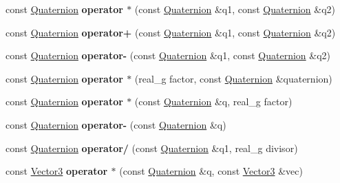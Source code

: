 \begin{DoxyCompactItemize}
\item 
\mbox{\label{classrev_1_1_quaternion_ade93d386a958d857910c26f3123c7700}} 
const \mbox{\hyperlink{classrev_1_1_quaternion}{Quaternion}} {\bfseries operator $\ast$} (const \mbox{\hyperlink{classrev_1_1_quaternion}{Quaternion}} \&q1, const \mbox{\hyperlink{classrev_1_1_quaternion}{Quaternion}} \&q2)
\item 
\mbox{\label{classrev_1_1_quaternion_acf05c9f6f012c5a4f735e79b49235ad8}} 
const \mbox{\hyperlink{classrev_1_1_quaternion}{Quaternion}} {\bfseries operator+} (const \mbox{\hyperlink{classrev_1_1_quaternion}{Quaternion}} \&q1, const \mbox{\hyperlink{classrev_1_1_quaternion}{Quaternion}} \&q2)
\item 
\mbox{\label{classrev_1_1_quaternion_a423e07c7e001606fb11165d3481bc1e5}} 
const \mbox{\hyperlink{classrev_1_1_quaternion}{Quaternion}} {\bfseries operator-\/} (const \mbox{\hyperlink{classrev_1_1_quaternion}{Quaternion}} \&q1, const \mbox{\hyperlink{classrev_1_1_quaternion}{Quaternion}} \&q2)
\item 
\mbox{\label{classrev_1_1_quaternion_a9bff2cf294243077e5a7674998499a16}} 
const \mbox{\hyperlink{classrev_1_1_quaternion}{Quaternion}} {\bfseries operator $\ast$} (real\+\_\+g factor, const \mbox{\hyperlink{classrev_1_1_quaternion}{Quaternion}} \&quaternion)
\item 
\mbox{\label{classrev_1_1_quaternion_a4ebbe394015f9dff21e32e82c37afcc4}} 
const \mbox{\hyperlink{classrev_1_1_quaternion}{Quaternion}} {\bfseries operator $\ast$} (const \mbox{\hyperlink{classrev_1_1_quaternion}{Quaternion}} \&q, real\+\_\+g factor)
\item 
\mbox{\label{classrev_1_1_quaternion_a3300cd957cdd277d08f4d5179e508650}} 
const \mbox{\hyperlink{classrev_1_1_quaternion}{Quaternion}} {\bfseries operator-\/} (const \mbox{\hyperlink{classrev_1_1_quaternion}{Quaternion}} \&q)
\item 
\mbox{\label{classrev_1_1_quaternion_a75448b8467abdb56ed07d5c4fa515bf5}} 
const \mbox{\hyperlink{classrev_1_1_quaternion}{Quaternion}} {\bfseries operator/} (const \mbox{\hyperlink{classrev_1_1_quaternion}{Quaternion}} \&q1, real\+\_\+g divisor)
\item 
\mbox{\label{classrev_1_1_quaternion_ad1c88b7e3f5c13dca07e6ff108416def}} 
const \mbox{\hyperlink{classrev_1_1_vector}{Vector3}} {\bfseries operator $\ast$} (const \mbox{\hyperlink{classrev_1_1_quaternion}{Quaternion}} \&q, const \mbox{\hyperlink{classrev_1_1_vector}{Vector3}} \&vec)
\end{DoxyCompactItemize}


